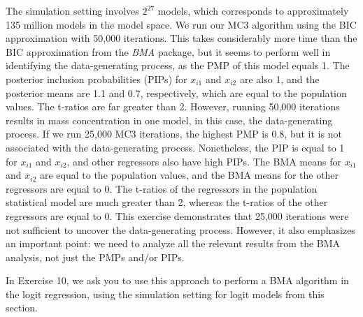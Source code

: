 The simulation setting involves $2^{27}$ models, which corresponds to approximately 135 million models in the model space. We run our MC3 algorithm using the BIC approximation with 50,000 iterations. This takes considerably more time than the BIC approximation from the \textit{BMA} package, but it seems to perform well in identifying the data-generating process, as the PMP of this model equals 1. The posterior inclusion probabilities (PIPs) for $x_{i1}$ and $x_{i2}$ are also 1, and the posterior means are 1.1 and 0.7, respectively, which are equal to the population values. The t-ratios are far greater than 2. However, running 50,000 iterations results in mass concentration in one model, in this case, the data-generating process. If we run 25,000 MC3 iterations, the highest PMP is 0.8, but it is not associated with the data-generating process. Nonetheless, the PIP is equal to 1 for $x_{i1}$ and $x_{i2}$, and other regressors also have high PIPs. The BMA means for $x_{i1}$ and $x_{i2}$ are equal to the population values, and the BMA means for the other regressors are equal to 0. The t-ratios of the regressors in the population statistical model are much greater than 2, whereas the t-ratios of the other regressors are equal to 0. This exercise demonstrates that 25,000 iterations were not sufficient to uncover the data-generating process. However, it also emphasizes an important point: we need to analyze all the relevant results from the BMA analysis, not just the PMPs and/or PIPs.

In Exercise 10, we ask you to use this approach to perform a BMA algorithm in the logit regression, using the simulation setting for logit models from this section.

